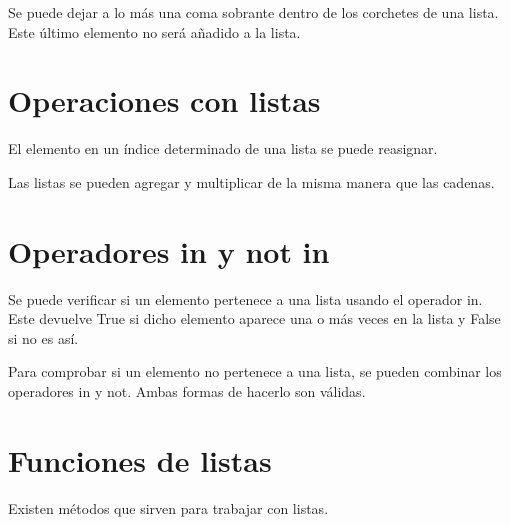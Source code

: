 \documentclass{report}
\begin{document}
Se puede dejar a lo más una coma sobrante dentro de los corchetes de una lista. Este último elemento no será añadido a la lista.


\section{Operaciones con listas}

El elemento en un índice determinado de una lista se puede reasignar.


Las listas se pueden agregar y multiplicar de la misma manera que las cadenas.


\section{Operadores in y not in}

Se puede verificar si un elemento pertenece a una lista usando el operador in. Este devuelve True si dicho elemento aparece una o más veces en la lista y False si no es así.


Para comprobar si un elemento no pertenece a una lista, se pueden combinar los operadores in y not. Ambas formas de hacerlo son válidas.


\section{Funciones de listas}

Existen métodos que sirven para trabajar con listas.
\end{document}
